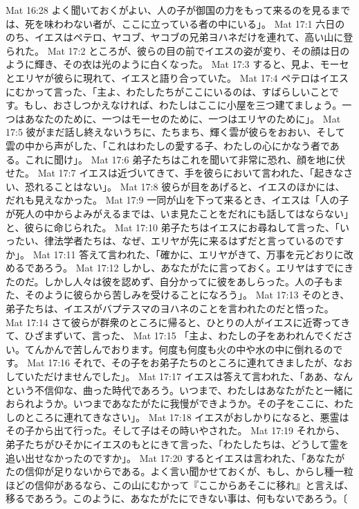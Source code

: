 Mat 16:28  よく聞いておくがよい、人の子が御国の力をもって来るのを見るまでは、死を味わわない者が、ここに立っている者の中にいる」。
Mat 17:1  六日ののち、イエスはペテロ、ヤコブ、ヤコブの兄弟ヨハネだけを連れて、高い山に登られた。
Mat 17:2  ところが、彼らの目の前でイエスの姿が変り、その顔は日のように輝き、その衣は光のように白くなった。
Mat 17:3  すると、見よ、モーセとエリヤが彼らに現れて、イエスと語り合っていた。
Mat 17:4  ペテロはイエスにむかって言った、「主よ、わたしたちがここにいるのは、すばらしいことです。もし、おさしつかえなければ、わたしはここに小屋を三つ建てましょう。一つはあなたのために、一つはモーセのために、一つはエリヤのために」。
Mat 17:5  彼がまだ話し終えないうちに、たちまち、輝く雲が彼らをおおい、そして雲の中から声がした、「これはわたしの愛する子、わたしの心にかなう者である。これに聞け」。
Mat 17:6  弟子たちはこれを聞いて非常に恐れ、顔を地に伏せた。
Mat 17:7  イエスは近づいてきて、手を彼らにおいて言われた、「起きなさい、恐れることはない」。
Mat 17:8  彼らが目をあげると、イエスのほかには、だれも見えなかった。
Mat 17:9  一同が山を下って来るとき、イエスは「人の子が死人の中からよみがえるまでは、いま見たことをだれにも話してはならない」と、彼らに命じられた。
Mat 17:10  弟子たちはイエスにお尋ねして言った、「いったい、律法学者たちは、なぜ、エリヤが先に来るはずだと言っているのですか」。
Mat 17:11  答えて言われた、「確かに、エリヤがきて、万事を元どおりに改めるであろう。
Mat 17:12  しかし、あなたがたに言っておく。エリヤはすでにきたのだ。しかし人々は彼を認めず、自分かってに彼をあしらった。人の子もまた、そのように彼らから苦しみを受けることになろう」。
Mat 17:13  そのとき、弟子たちは、イエスがバプテスマのヨハネのことを言われたのだと悟った。
Mat 17:14  さて彼らが群衆のところに帰ると、ひとりの人がイエスに近寄ってきて、ひざまずいて、言った、
Mat 17:15  「主よ、わたしの子をあわれんでください。てんかんで苦しんでおります。何度も何度も火の中や水の中に倒れるのです。
Mat 17:16  それで、その子をお弟子たちのところに連れてきましたが、なおしていただけませんでした」。
Mat 17:17  イエスは答えて言われた、「ああ、なんという不信仰な、曲った時代であろう。いつまで、わたしはあなたがたと一緒におられようか。いつまであなたがたに我慢ができようか。その子をここに、わたしのところに連れてきなさい」。
Mat 17:18  イエスがおしかりになると、悪霊はその子から出て行った。そして子はその時いやされた。
Mat 17:19  それから、弟子たちがひそかにイエスのもとにきて言った、「わたしたちは、どうして霊を追い出せなかったのですか」。
Mat 17:20  するとイエスは言われた、「あなたがたの信仰が足りないからである。よく言い聞かせておくが、もし、からし種一粒ほどの信仰があるなら、この山にむかって『ここからあそこに移れ』と言えば、移るであろう。このように、あなたがたにできない事は、何もないであろう。〔
